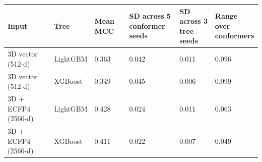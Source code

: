 \begin{tabular}{llllll}
\toprule
Input & Tree & Mean MCC & \shortstack{SD across 5\\conformer seeds} & \shortstack{SD across 3\\tree seeds} & \shortstack{Range over\\conformers} \\
\midrule
3D vector (512-d) & LightGBM & 0.363 & 0.042 & 0.011 & 0.096 \\
3D vector (512-d) & XGBoost & 0.349 & 0.045 & 0.006 & 0.099 \\
3D + ECFP4 (2560-d) & LightGBM & 0.428 & 0.024 & 0.011 & 0.063 \\
3D + ECFP4 (2560-d) & XGBoost & 0.411 & 0.022 & 0.007 & 0.049 \\
\bottomrule
\end{tabular}
